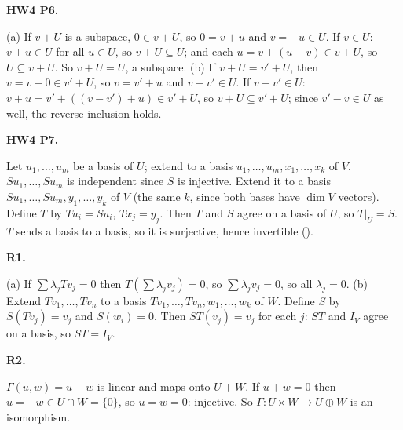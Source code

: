 \documentclass[10pt]{scrartcl}
\begin{document}
\begin{prob}\textbf{HW4 P6.}\par{}
\begin{steps}
  \ii (a) If $v+U$ is a subspace, $0\in v+U$, so $0=v+u$ and $v=-u\in U$.
  \ii If $v\in U$: $v+u\in U$ for all $u\in U$, so $v+U\subseteq U$; and each $u=v+(u-v)\in v+U$, so $U\subseteq v+U$. So $v+U=U$, a subspace.
  \ii (b) If $v+U=v'+U$, then $v=v+0\in v'+U$, so $v=v'+u$ and $v-v'\in U$.
  \ii If $v-v'\in U$: $v+u=v'+((v-v')+u)\in v'+U$, so $v+U\subseteq v'+U$; since $v'-v\in U$ as well, the reverse inclusion holds.
\end{steps}
\end{prob}

\begin{prob}\textbf{HW4 P7.}\par{}
\begin{steps}
  \ii Let $u_1,\dots,u_m$ be a basis of $U$; extend to a basis $u_1,\dots,u_m,x_1,\dots,x_k$ of $V$.
  \ii $Su_1,\dots,Su_m$ is independent since $S$ is injective. Extend it to a basis $Su_1,\dots,Su_m,y_1,\dots,y_k$ of $V$ (the same $k$, since both bases have $\dim V$ vectors).
  \ii Define $T$ by $Tu_i=Su_i$, $Tx_j=y_j$. Then $T$ and $S$ agree on a basis of $U$, so $T|_U=S$.
  \ii $T$ sends a basis to a basis, so it is surjective, hence invertible ().
\end{steps}
\end{prob}

\begin{prob}\textbf{R1.}\par{}
\begin{steps}
  \ii (a) If $\sum\lambda_jTv_j=0$ then $T(\sum\lambda_jv_j)=0$, so $\sum\lambda_jv_j=0$, so all $\lambda_j=0$.
  \ii (b) Extend $Tv_1,\dots,Tv_n$ to a basis $Tv_1,\dots,Tv_n,w_1,\dots,w_k$ of $W$. Define $S$ by $S(Tv_j)=v_j$ and $S(w_i)=0$.
  \ii Then $ST(v_j)=v_j$ for each $j$: $ST$ and $I_V$ agree on a basis, so $ST=I_V$.
\end{steps}
\end{prob}

\begin{prob}\textbf{R2.}\par{}
$\Gamma(u,w)=u+w$ is linear and maps onto $U+W$. If $u+w=0$ then $u=-w\in U\cap W=\{0\}$, so $u=w=0$: injective. So $\Gamma\colon U\times W\to U\oplus W$ is an isomorphism.
\end{prob}
\end{document}
